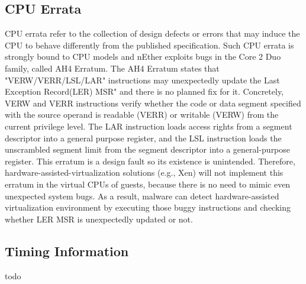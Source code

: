 \subsection{CPU Errata}
\label{sec:approach-errata}
CPU errata refer to the collection of design defects or errors that may induce the CPU to behave differently from the published specification. Such CPU errata is strongly bound to CPU models and nEther exploits bugs in the Core 2 Duo family, called AH4 Erratum. The AH4 Erratum states that "VERW/VERR/LSL/LAR" instructions may unexpectedly update the Last Exception Record(LER) MSR" and there is no planned fix for it. Concretely, VERW and VERR instructions verify whether the code or data segment specified with the source operand is readable (VERR) or writable (VERW) from the current privilege level. The LAR instruction loads access rights from a segment descriptor into a general purpose register, and the LSL instruction loads the unscrambled segment limit from the segment descriptor into a general-purpose register. This erratum is a design fault so its existence is unintended. Therefore, hardware-assisted-virtualization solutions (e.g., Xen) will not implement this erratum in the virtual CPUs of guests, because there is no need to mimic even unexpected system bugs. As a result, malware can detect hardware-assisted virtualization environment by executing those buggy instructions and checking whether LER MSR is unexpectedly updated or not.



\subsection{Timing Information}
\label{sec:approach-timing}

todo


